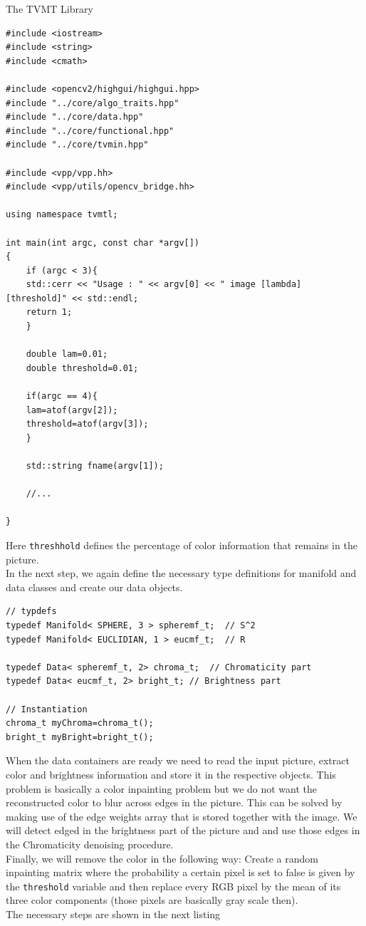 \begin{chapter}{The TVMT Library}
\cppinline
\begin{lstlisting}[label=code:tut2_init,caption={Include library files and read parameters from standard input}]
#include <iostream>
#include <string>
#include <cmath>

#include <opencv2/highgui/highgui.hpp>
#include "../core/algo_traits.hpp"
#include "../core/data.hpp"
#include "../core/functional.hpp"
#include "../core/tvmin.hpp"

#include <vpp/vpp.hh>
#include <vpp/utils/opencv_bridge.hh>

using namespace tvmtl;

int main(int argc, const char *argv[])
{
    if (argc < 3){
	std::cerr << "Usage : " << argv[0] << " image [lambda] [threshold]" << std::endl;
	return 1;
    }

    double lam=0.01;
    double threshold=0.01;

    if(argc == 4){
	lam=atof(argv[2]);
	threshold=atof(argv[3]);
    }   

    std::string fname(argv[1]);

    //...

}
\end{lstlisting}
Here \texttt{threshhold} defines the percentage of color information that remains in the picture.\\
In the next step, we again define the necessary type definitions for manifold and data classes and create our data objects.

\cppinline
\begin{lstlisting}[label=code:tut2_mfdata,caption={Manifold and Data class type definitions and instantiation}]
// typdefs
typedef Manifold< SPHERE, 3 > spheremf_t;  // S^2
typedef Manifold< EUCLIDIAN, 1 > eucmf_t;  // R
 
typedef Data< spheremf_t, 2> chroma_t;	// Chromaticity part
typedef Data< eucmf_t, 2> bright_t;	// Brightness part

// Instantiation
chroma_t myChroma=chroma_t();
bright_t myBright=bright_t();
\end{lstlisting}

When the data containers are ready we need to read the input picture, extract color and brightness information and store it in the respective objects.
This problem is basically a color inpainting problem but we do not want the reconstructed color to blur across edges in the picture. This can be solved
by making use of the edge weights array that is stored together with the image. We will detect edged in the brightness part of the picture and and
use those edges in the Chromaticity denoising procedure.\\
Finally, we will remove the color in the following way: Create a random inpainting matrix where the probability a certain pixel is set to false is given
by the \texttt{threshold} variable and then replace every RGB pixel by the mean of its three color components (those pixels are basically gray scale then).\\
The necessary steps are shown in the next listing


\end{chapter}
